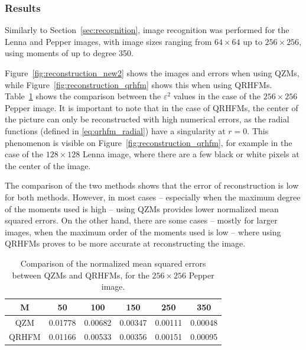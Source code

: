 \subsubsection{Results}
Similarly to Section~\ref{sec:recognition}, image recognition was performed for the Lenna and Pepper images, with image sizes ranging from $64 \times 64$ up to $256 \times 256$, using moments of up to degree 350.

Figure~\ref{fig:reconstruction_new2} shows the images and errors when using QZMs, while Figure~\ref{fig:reconstruction_qrhfm} shows this when using QRHFMs. Table~\ref{tab:epsilons_QRHFM} shows the comparison between the $\varepsilon^2$ values in the case of the $256 \times 256$ Pepper image.
It is important to note that in the case of QRHFMs, the center of the picture can only be reconstructed with high numerical errors, as the radial functions (defined in \eqref{eq:qrhfm_radial}) have a singularity at $r = 0$. This phenomenon is visible on Figure~\ref{fig:reconstruction_qrhfm}, for example in the case of the $128 \times 128$ Lenna image, where there are a few black or white pixels at the center of the image.

The comparison of the two methods shows that the error of reconstruction is low for both methods. However, in most cases -- especially when the maximum degree of the moments used is high -- using QZMs provides lower normalized mean squared errors. On the other hand, there are some cases -- mostly for larger images, when the maximum order of the moments used is low -- where using QRHFMs proves to be more accurate at reconstructing the image.


\begin{table}
    \centering
    \begin{tabular}{|c||c|c|c|c|c|}
        M & 50 & 100 & 150 & 250 & 350 \\ \hline
        QZM & 0.01778 & 0.00682 & 0.00347 & 0.00111 & 0.00048 \\ 
        QRHFM & 0.01166 & 0.00533 & 0.00356 & 0.00151 & 0.00095
    \end{tabular}
    \caption{Comparison of the normalized mean squared errors between QZMs and QRHFMs, for the $256 \times 256$ Pepper image.}
    \label{tab:epsilons_QRHFM}
\end{table}



